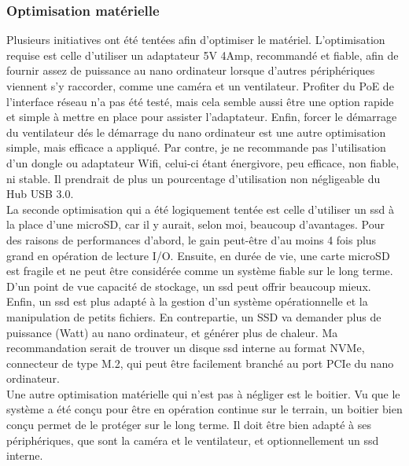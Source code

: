 \subsubsection{Optimisation matérielle}
\noindent Plusieurs initiatives ont été tentées afin d'optimiser le matériel. L'optimisation requise est celle d'utiliser un adaptateur 5V 4Amp, recommandé et fiable, afin de fournir assez de puissance au nano ordinateur lorsque d'autres périphériques viennent s'y raccorder, comme une caméra et un ventilateur. Profiter du PoE de l'interface réseau n'a pas été testé, mais cela semble aussi être une option rapide et simple à mettre en place pour assister l'adaptateur. Enfin, forcer le démarrage du ventilateur dés le démarrage du nano ordinateur est une autre optimisation simple, mais efficace a appliqué. Par contre, je ne recommande pas l'utilisation d'un dongle ou adaptateur Wifi, celui-ci étant énergivore, peu efficace, non fiable, ni stable. Il prendrait de plus un pourcentage d'utilisation non négligeable du Hub USB 3.0. 
\vspace{\baselineskip}
\\
\noindent La seconde optimisation qui a été logiquement tentée est celle d'utiliser un \acrshort{ssd} à la place d'une microSD, car il y aurait, selon moi, beaucoup d'avantages. Pour des raisons de performances d'abord, le gain peut-être d'au moins 4 fois plus grand en opération de lecture I/O. Ensuite, en durée de vie, une carte microSD est fragile et ne peut être considérée comme un système fiable sur le long terme. D'un point de vue capacité de stockage, un \acrshort{ssd} peut offrir beaucoup mieux. Enfin, un \acrshort{ssd} est plus adapté à la gestion d'un système opérationnelle et la manipulation de petits fichiers. En contrepartie, un SSD va demander plus de puissance (Watt) au nano ordinateur, et générer plus de chaleur. Ma recommandation serait de trouver un disque \acrshort{ssd} interne au format NVMe, connecteur de type M.2, qui peut être facilement branché au port PCIe du nano ordinateur.
\vspace{\baselineskip}
\\
\noindent Une autre optimisation matérielle qui n'est pas à négliger est le boitier. Vu que le système a été conçu pour être en opération continue sur le terrain, un boitier bien conçu permet de le protéger sur le long terme. Il doit être bien adapté à ses périphériques, que sont la caméra et le ventilateur, et optionnellement un \acrshort{ssd} interne.
